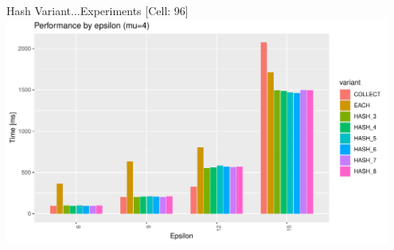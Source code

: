 \documentclass{beamer}
\begin{document}
\begin{frame}{Hash Variant...}{Experiments [Cell: 96]}
    \centering
    \includegraphics[width=0.95\textwidth]{figures/C_96E_15_M4} 
\end{frame}
\end{document}
